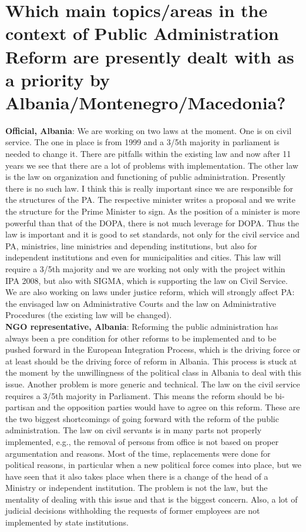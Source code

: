 \section{Which main topics/areas in the context of Public Administration Reform are presently dealt with as a priority by Albania/Montenegro/Macedonia? }
\textbf{Official, Albania}: We are working on two laws at the moment. One is on civil service. The one in place is from 1999 and a 3/5th majority in parliament is needed to change it. There are pitfalls within the existing law and now after 11 years we see that there are a lot of problems with implementation. The other law is the law on organization and functioning of public administration. Presently there is no such law. I think this is really important since we are responsible for the structures of the PA. The respective minister writes a proposal and we write the structure for the Prime Minister to sign. As the position of a minister is more powerful than that of the DOPA, there is not much leverage for DOPA. Thus the law is important and it is good to set standards, not only for the civil service and PA, ministries, line ministries and depending institutions, but also for independent institutions and even for municipalities and cities. This law will require a 3/5th majority and we are working not only with the project within IPA 2008, but also with SIGMA, which is supporting the law on Civil Service. We are also working on laws under justice reform, which will strongly affect PA: the envisaged law on Administrative Courts and the law on Administrative Procedures (the existing law will be changed).\\
\textbf{NGO representative, Albania}: Reforming the public administration has always been a pre condition for other reforms to be implemented and to be pushed forward in the European Integration Process, which is the driving force or at least should be the driving force of reform in Albania. This process is stuck at the moment by the unwillingness of the political class in Albania to deal with this issue. Another problem is more generic and technical. The law on the civil service requires a 3/5th majority in Parliament. This means the reform should be bi-partisan and the opposition parties would have to agree on this reform. These are the two biggest shortcomings of going forward with the reform of the public administration. The law on civil servants is in many parts not properly implemented, e.g., the removal of persons from office is not based on proper argumentation and reasons. Most of the time, replacements were done for political reasons, in particular when a new political force comes into place, but we have seen that it also takes place when there is a change of the head of a Ministry or independent institution. The problem is not the law, but the mentality of dealing with this issue and that is the biggest concern. Also, a lot of judicial decisions withholding the requests of former employees are not implemented by state institutions.\\
